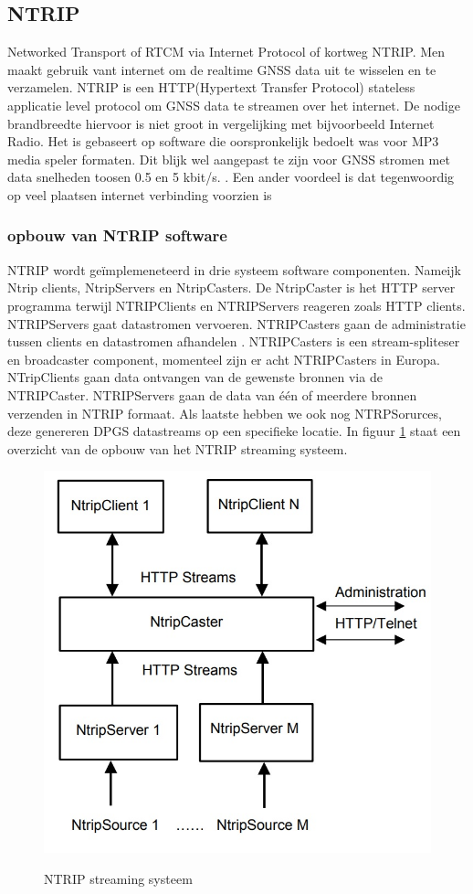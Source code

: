 \subsection{NTRIP}
\label{LNTR}
Networked Transport of RTCM via Internet Protocol of kortweg NTRIP. Men maakt gebruik vant internet om de realtime GNSS data uit te wisselen en te verzamelen. NTRIP is een HTTP(Hypertext Transfer Protocol) stateless applicatie level protocol om GNSS data te streamen over het internet. De nodige brandbreedte hiervoor is niet groot in vergelijking met bijvoorbeeld Internet Radio\cite{LBibNTRIP}. Het is gebaseert op software die oorspronkelijk bedoelt was voor MP3 media speler formaten. Dit blijk wel aangepast te zijn voor GNSS stromen met data snelheden toosen 0.5 en 5 kbit/s. \cite{LBibGPS}. Een ander voordeel is dat tegenwoordig op veel plaatsen internet verbinding voorzien is \cite{LBibNTRIP}

\subsubsection{opbouw van NTRIP software}
\label{LONS}
NTRIP wordt ge\"implemeneteerd in drie systeem software componenten. Nameijk Ntrip clients, NtripServers en NtripCasters. De NtripCaster is het HTTP server programma terwijl NTRIPClients en NTRIPServers reageren zoals HTTP clients\cite{LBibNTRIP}. NTRIPServers gaat datastromen vervoeren. NTRIPCasters gaan de administratie tussen clients en datastromen afhandelen \cite{LBibGPS}. NTRIPCasters is een stream-spliteser en broadcaster component, momenteel zijn er acht NTRIPCasters in Europa. NTripClients gaan data ontvangen van de gewenste bronnen via de NTRIPCaster. NTRIPServers gaan de data van \'e\'en of meerdere bronnen verzenden in NTRIP formaat. Als laatste hebben we ook nog NTRPSorurces, deze genereren DPGS datastreams op een specifieke locatie. \cite{LBibNTRIP} In figuur \ref{imgNTRIP} staat een overzicht van de opbouw van het NTRIP streaming systeem.

\begin{figure}[hpb]
	\includegraphics[scale=0.65]{NTRIP.jpg}
	\caption{NTRIP streaming systeem}
	\cite{LBibNTRIP}
	\label{imgNTRIP}
\end{figure} 
 



